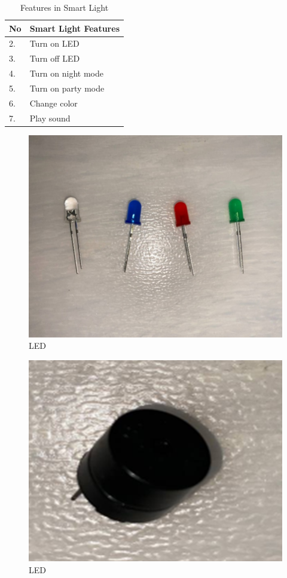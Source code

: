 \begin{table}[]
\begin{center}
\caption{Features in Smart Light}
\begin{tabular}{|l|l|}
\hline
No & Smart   Light Features \\ \hline
2. & Turn on LED            \\ \hline
3. & Turn off LED           \\ \hline
4. & Turn on night mode     \\ \hline
5. & Turn on party mode     \\ \hline
6. & Change color           \\ \hline
7. & Play sound             \\ \hline
\end{tabular}
\end{center}
\end{table}



\begin{figure}[htbp]
\centerline{\includegraphics{image1.png}}
\caption{LED}
\label{fig}
\end{figure}

\begin{figure}[htbp]
\centerline{\includegraphics{image2.png}}
\caption{LED}
\label{fig}
\end{figure}

